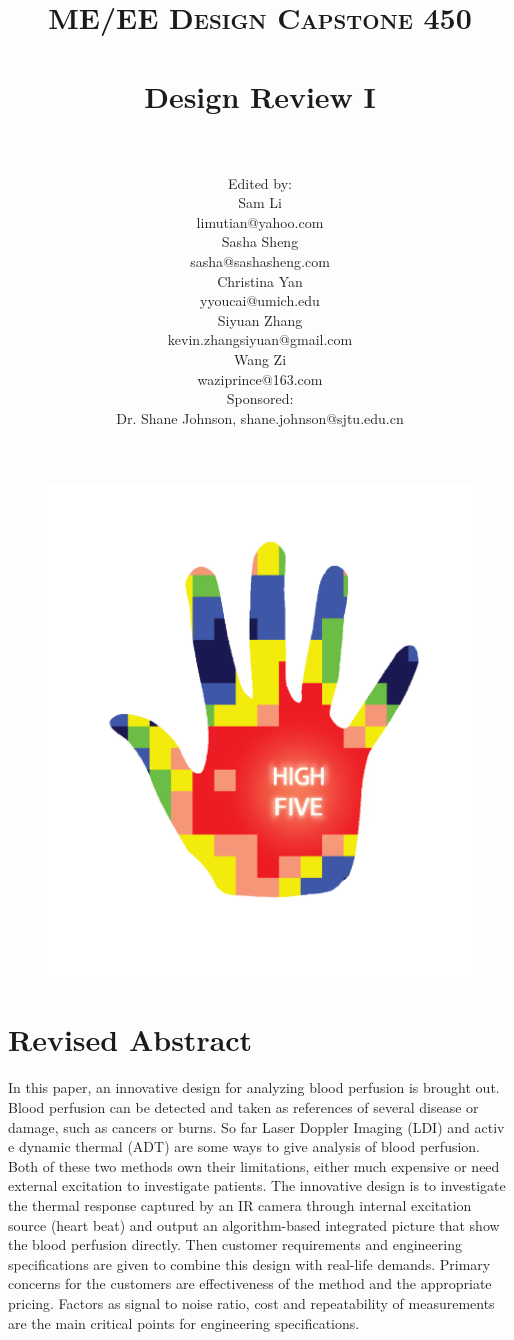 \documentclass[paper=letter, fontsize=11pt]{scrartcl}
\title{
		\vspace{-1in} 	
		\usefont{OT1}{bch}{b}{n}
		\normalfont \normalsize \textsc{ME/EE Design Capstone 450} \\ [25pt]
		\horrule{0.5pt} \\[0.4cm]
		\huge Design Review I \\
		\horrule{2pt} \\[0.5cm]
}
\author{
        \normalfont 							
        \normalsize
        Edited by: \\
        Sam Li \\ limutian@yahoo.com \\[2pt]
        Sasha Sheng \\ sasha@sashasheng.com\\[2pt]
        Christina Yan \\ yyoucai@umich.edu\\[2pt]
        Siyuan Zhang\\ kevin.zhangsiyuan@gmail.com\\[2pt]
        Wang Zi \\ waziprince@163.com\\ [2pt]
         Sponsored: \\ Dr. Shane Johnson,  shane.johnson@sjtu.edu.cn\\ \vspace{0.5cm}
}
\numberwithin{equation}{section}		%
\numberwithin{figure}{section}			%
\numberwithin{table}{section}			%
\begin{document}
\maketitle
\begin{figure}[H]
    \centering
    \includegraphics[scale=0.7]{LOGO.png}
\end{figure}
\pagebreak
\tableofcontents
\pagebreak
	
\section{Revised Abstract}	
In this paper, an innovative design for analyzing blood perfusion is brought out. Blood perfusion can be detected and
taken as references of several disease or damage, such as cancers or burns. So far Laser Doppler Imaging (LDI) and activ
e dynamic thermal (ADT) are some ways to give analysis of blood perfusion.  Both of these two methods own their 
limitations, either much expensive or need external excitation to investigate patients. The innovative design is to 
investigate the thermal response captured by an IR camera through internal excitation source (heart beat) and output an 
algorithm-based integrated picture that show the blood perfusion directly. Then customer requirements and engineering 
specifications are given to combine this design with real-life demands. Primary concerns for the customers are effectiveness
of the method and the appropriate pricing. Factors as signal to noise ratio, cost and repeatability of measurements are the
main critical points for engineering specifications.
\end{document}
